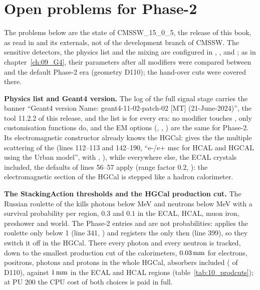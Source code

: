 \FloatBarrier
\section{Open problems for Phase-2}
\label{sec:10_phase2}

The problems below are the state of CMSSW\_15\_0\_5, the release of this book, as read in
 and its externals, not of the development branch of CMSSW. The sensitive
detectors, the physics list and the mixing are configured in , ,
 and ; as in chapter~\ref{ch:09_G4}, their parameters after
all modifiers were compared between  and the default Phase-2 era  (geometry
D110); the hand-over cuts were covered there.

\textbf{Physics list and Geant4 version.} The log of the full signal stage carries the
banner ``Geant4 version Name: geant4-11-02-patch-02 [MT] (21-June-2024)'', the  tool 11.2.2 of this
release, and the list is  for every era: no modifier touches , only
customisation functions do, and the EM options (, ,
) are the same for Phase-2. Its electromagnetic constructor already knows the HGCal:  gives
the  the multiple scattering of the  (lines 112--113 and 142--190, ``e-/e+ msc
for HCAL and HGCAL using the Urban model'', with , ),
while everywhere else, the ECAL crystals included, the defaults of lines 56--57 apply (range factor $0.2$,
): the electromagnetic section of the HGCal is stepped like a hadron calorimeter.

\textbf{The StackingAction thresholds and the HGCal production cut.} The Russian roulette of the
 kills photons below  MeV and neutrons below
 MeV with a survival probability per region, $0.3$ and $0.1$ in the ECAL, HCAL,
muon iron, preshower and world. The Phase-2 entries  and 
are not probabilities:  applies the roulette only below 1 (line
341, ) and registers the  only then (line 399), so they switch it off in the
HGCal. There every photon and every neutron is tracked, down to the smallest production cut of the calorimeters,
$0.03\,\mathrm{mm}$ for electrons, positrons, photons and protons in the whole HGCal, absorbers included
( of D110), against $1\,\mathrm{mm}$ in the ECAL and HCAL regions (table~\ref{tab:10_prodcuts}); at
PU 200 the CPU cost of both choices is paid in full.

